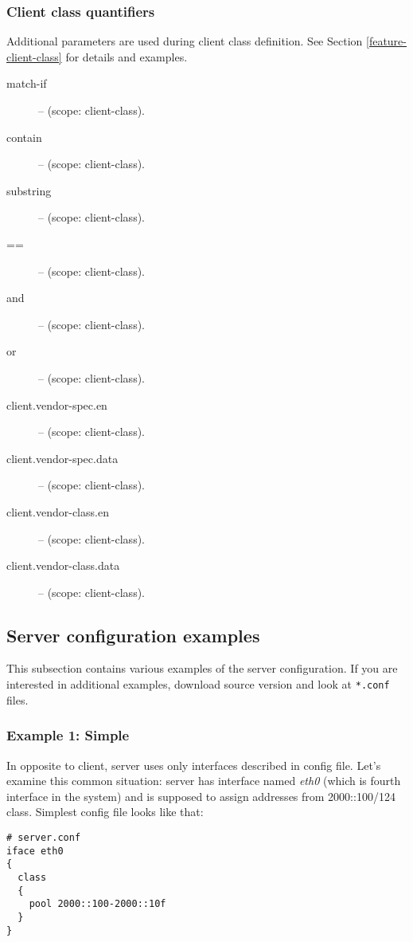 \subsubsection{Client class quantifiers}
\label{class-expressions}
Additional parameters are used during client class definition. See
Section \ref{feature-client-class} for details and examples.

\begin{description}
\item[match-if] -- (scope: client-class).
\item[contain] -- (scope: client-class).
\item[substring] -- (scope: client-class).
\item[==] -- (scope: client-class).
\item[and] -- (scope: client-class).
\item[or] -- (scope: client-class).
\item[client.vendor-spec.en] -- (scope: client-class).
\item[client.vendor-spec.data] -- (scope: client-class).
\item[client.vendor-class.en] -- (scope: client-class).
\item[client.vendor-class.data] -- (scope: client-class).
\end{description}


\subsection{Server configuration examples}

This subsection contains various examples of the server
configuration. If you are interested in additional examples, download
source version and look at \verb+*.conf+ files.

\subsubsection{Example 1: Simple}

In opposite to client, server uses only interfaces described in config
file. Let's examine this common situation: server has interface named
\emph{eth0} (which is fourth interface in the system) and is supposed
to assign addresses from 2000::100/124 class. Simplest config file
looks like that:

\begin{lstlisting}
# server.conf
iface eth0
{
  class
  {
    pool 2000::100-2000::10f
  }
}
\end{lstlisting}

